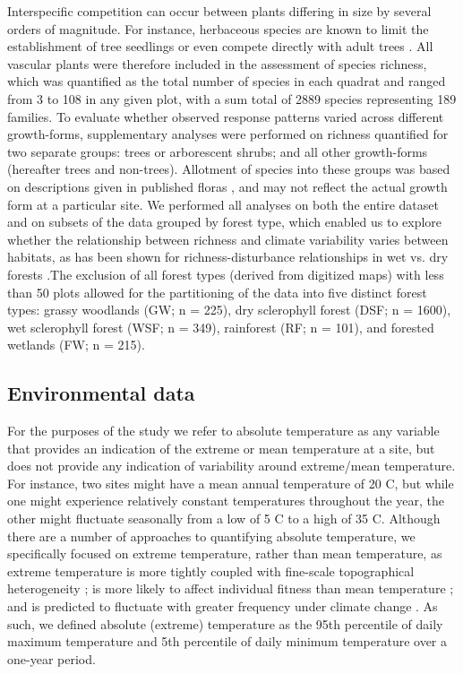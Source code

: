 Interspecific competition can occur between plants differing in size by several orders of magnitude. For instance, herbaceous species are known to limit the establishment of tree seedlings or even compete directly with adult trees \citep[e.g.][]{Riginos2009}. All vascular plants were therefore included in the assessment of species richness, which was quantified as the total number of species in each quadrat and ranged from 3 to 108 in any given plot, with a sum total of 2889 species representing 189 families. To evaluate whether observed response patterns varied across different growth-forms, supplementary analyses were performed on richness quantified for two separate groups: trees or arborescent shrubs; and all other growth-forms (hereafter trees and non-trees). Allotment of species into these groups was based on descriptions given in published floras \citep{Harden1993}, and may not reflect the actual growth form at a particular site. We performed all analyses on both the entire dataset and on subsets of the data grouped by forest type, which enabled us to explore whether the relationship between richness and climate variability varies between habitats, as has been shown for richness-disturbance relationships in wet vs. dry forests \citep{Bongers2009}.The exclusion of all forest types (derived from digitized maps) with less than 50 plots allowed for the partitioning of the data into five distinct forest types: grassy woodlands (GW; n = 225), dry sclerophyll forest (DSF; n = 1600), wet sclerophyll forest (WSF; n = 349), rainforest (RF; n = 101), and forested wetlands (FW; n = 215).

\subsection{Environmental data}

For the purposes of the study we refer to absolute temperature as any variable that provides an indication of the extreme or mean temperature at a site, but does not provide any indication of variability around extreme/mean temperature. For instance, two sites might have a mean annual temperature of 20 {\textdegree}C, but while one might experience relatively constant temperatures throughout the year, the other might fluctuate seasonally from a low of 5 {\textdegree}C to a high of 35 {\textdegree}C. Although there are a number of approaches to quantifying absolute temperature, we specifically focused on extreme temperature, rather than mean temperature, as extreme temperature is more tightly coupled with fine-scale topographical heterogeneity \citep{Suggitt2011}; is more likely to affect individual fitness than mean temperature \citep{Stenseth2002, Reyer2012}; and is predicted to fluctuate with greater frequency under climate change \citep{Smith2011}. As such, we defined absolute (extreme) temperature as the 95th percentile of daily maximum temperature and 5th percentile of daily minimum temperature over a one-year period.

